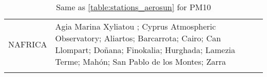 \documentclass[journal abbreviation, manuscript]{copernicus}
\begin{document}
\begin{table}
\begin{tabularx}{\textwidth}{lX}
  NAFRICA  & Agia Marina Xyliatou ; Cyprus Atmospheric Observatory; Aliartos; Barcarrota; Cairo; Can Llompart; Doñana; Finokalia; Hurghada; Lamezia Terme; Mahón; San Pablo de los Montes; Zarra                                                                                                                                                                                                                                                                                                                                                                                                                                                                                                                                                                                                                                                                                                                                                                                                                                                                                                                                                                                                                                                                                                                                                                                                                                                                                                                                                                                                                                                                                                                                                                                                                                                                                                                                                                                                                             \\
  \bottomhline
 \end{tabularx}
 \caption{Same as \ref{table:stations_aerosun} for PM10}
 \label{table:stations_pm10}
\end{table}

\clearpage
\end{document}
